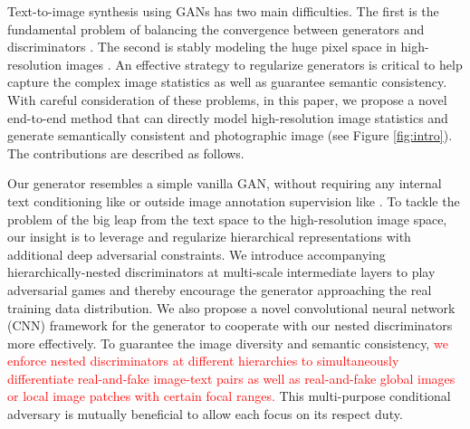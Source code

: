 \documentclass[10pt,twocolumn,letterpaper]{article}
\begin{document}
Text-to-image synthesis using GANs has two main difficulties. The first is the fundamental problem of balancing the convergence between generators and discriminators \cite{goodfellow2014generative,improvedGAN}. %
The second is stably modeling the huge pixel space in high-resolution images \cite{han2017stackgan}. 
An effective strategy to regularize generators is critical to help capture the complex image statistics \cite{huang2016stacked} as well as guarantee semantic consistency. 
With careful consideration of these problems, in this paper, we propose a novel end-to-end method that can directly model high-resolution image statistics and generate semantically consistent and photographic image (see Figure \ref{fig:intro}). The contributions are described as follows.


Our generator resembles a simple vanilla GAN, without requiring any internal text conditioning like \cite{han2017stackgan} or outside image annotation supervision like \cite{dash2017tac}. To tackle the problem of the big leap from the text space to the high-resolution image space, our insight is to leverage and regularize hierarchical representations with additional deep adversarial constraints. 
We introduce accompanying hierarchically-nested discriminators at multi-scale intermediate layers to play adversarial games and thereby encourage the generator approaching the real training data distribution. 
We also propose a novel convolutional neural network (CNN) framework for the generator to cooperate with our nested discriminators more effectively.
To guarantee the image diversity and semantic consistency,
\textcolor{red}{we enforce nested discriminators at different hierarchies to simultaneously differentiate real-and-fake image-text pairs as well as real-and-fake global images or local image patches with certain focal ranges.}
This multi-purpose conditional adversary is mutually beneficial to allow each focus on its respect duty. 
\end{document}
